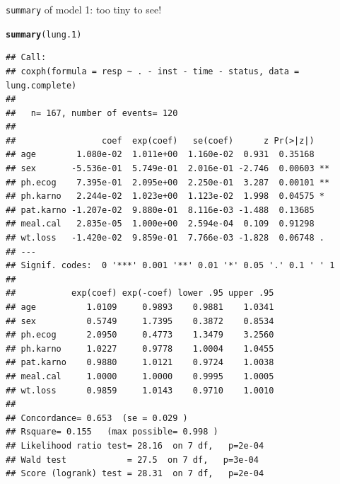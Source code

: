 \documentclass[unknownkeysallowed]{beamer}\usepackage[]{graphicx}\usepackage[]{color}
\makeatletter
\newcommand{\hlstd}[1]{\textcolor[rgb]{0.345,0.345,0.345}{#1}}%
\newcommand{\hlkwd}[1]{\textcolor[rgb]{0.737,0.353,0.396}{\textbf{#1}}}%
\newenvironment{kframe}{%
 \def\at@end@of@kframe{}%
 \ifinner\ifhmode%
  \def\at@end@of@kframe{\end{minipage}}%
  \begin{minipage}{\columnwidth}%
 \fi\fi%
 \def\FrameCommand##1{\hskip\@totalleftmargin \hskip-\fboxsep
 \colorbox{shadecolor}{##1}\hskip-\fboxsep
     \hskip-\linewidth \hskip-\@totalleftmargin \hskip\columnwidth}%
 \MakeFramed {\advance\hsize-\width
   \@totalleftmargin\z@ \linewidth\hsize
   \@setminipage}}%
 {\par\unskip\endMakeFramed%
 \at@end@of@kframe}
\newenvironment{knitrout}{}{} %
\makeatother
\begin{document}
\begin{frame}[fragile]{\texttt{summary} of model 1: too tiny to see!}

 
\begin{knitrout}\tiny
{}\color{fgcolor}\begin{kframe}
\begin{alltt}
\hlkwd{summary}\hlstd{(lung.1)}
\end{alltt}
\begin{verbatim}
## Call:
## coxph(formula = resp ~ . - inst - time - status, data = lung.complete)
## 
##   n= 167, number of events= 120 
## 
##                 coef  exp(coef)   se(coef)      z Pr(>|z|)   
## age        1.080e-02  1.011e+00  1.160e-02  0.931  0.35168   
## sex       -5.536e-01  5.749e-01  2.016e-01 -2.746  0.00603 **
## ph.ecog    7.395e-01  2.095e+00  2.250e-01  3.287  0.00101 **
## ph.karno   2.244e-02  1.023e+00  1.123e-02  1.998  0.04575 * 
## pat.karno -1.207e-02  9.880e-01  8.116e-03 -1.488  0.13685   
## meal.cal   2.835e-05  1.000e+00  2.594e-04  0.109  0.91298   
## wt.loss   -1.420e-02  9.859e-01  7.766e-03 -1.828  0.06748 . 
## ---
## Signif. codes:  0 '***' 0.001 '**' 0.01 '*' 0.05 '.' 0.1 ' ' 1
## 
##           exp(coef) exp(-coef) lower .95 upper .95
## age          1.0109     0.9893    0.9881    1.0341
## sex          0.5749     1.7395    0.3872    0.8534
## ph.ecog      2.0950     0.4773    1.3479    3.2560
## ph.karno     1.0227     0.9778    1.0004    1.0455
## pat.karno    0.9880     1.0121    0.9724    1.0038
## meal.cal     1.0000     1.0000    0.9995    1.0005
## wt.loss      0.9859     1.0143    0.9710    1.0010
## 
## Concordance= 0.653  (se = 0.029 )
## Rsquare= 0.155   (max possible= 0.998 )
## Likelihood ratio test= 28.16  on 7 df,   p=2e-04
## Wald test            = 27.5  on 7 df,   p=3e-04
## Score (logrank) test = 28.31  on 7 df,   p=2e-04
\end{verbatim}
\end{kframe}
\end{knitrout}


\end{frame}
\end{document}
